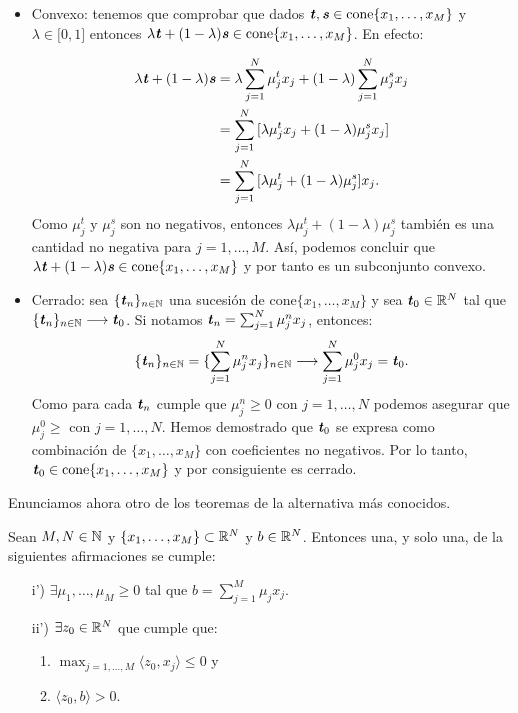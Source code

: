 \begin{itemize}
	\item  Convexo: tenemos que comprobar que dados $ \textbf{\emph{t}}, \textbf{\emph{s}} \in \mathrm{cone}\{x_1,\dots, x_M \} $ y $ \lambda \in \lbrack 0,1 \rbrack $ entonces $ \lambda\textbf{\emph{t}} + (1-\lambda)\textbf{\emph{s}} \in \mathrm{cone}\{x_1,\dots, x_M \} $. En efecto:

	\begin{equation*}
	\begin{split}
		\lambda\textbf{\emph{t}} + (1-\lambda)\textbf{\emph{s}} &=   \lambda \sum_{j=1}^{N}{\mu_j^t x_j } + (1-\lambda)\sum_{j=1}^{N}{\mu_j^s x_j } \\
		&= \sum_{j=1}^{N}{\lbrack \lambda \mu_j^t x_j  + (1-\lambda)\mu_j^s x_j \rbrack} \\
		&= \sum_{j=1}^{N}{\lbrack \lambda \mu_j^t  + (1-\lambda)\mu_j^s \rbrack x_j}.
		\end{split}
		\end{equation*}
Como $ \mu_j^t \text{ y } \mu_j^s $ son no negativos, entonces $ \lambda \mu_j^t  + (1-\lambda)\mu_j^s  $ también es una cantidad no negativa para $ j=1,\dots,M $. Así, podemos concluir que $ \lambda\textbf{\emph{t}} + (1-\lambda)\textbf{\emph{s}} \in \mathrm{cone}\{x_1,\dots, x_M \} $ y por tanto es un subconjunto convexo.

\item Cerrado: sea $ \lbrace \textbf{\emph{t}}_n \rbrace_{ n \in \mathbb{N}} $ una sucesión de $ \mathrm{cone}\{x_1,\dots, x_M \} $ y sea $ \textbf{\emph{t}}_0 \in \mathbb{R}^N $ tal que $ \lbrace \textbf{\emph{t}}_n \rbrace_{ n \in \mathbb{N}} \longrightarrow \textbf{\emph{t}}_0 $. Si notamos $ \textbf{\emph{t}}_n = \sum_{j=1}^{N}{\mu_j^n x_j }$, entonces:
\[
\lbrace \textbf{\emph{t}}_n \rbrace_{ n \in \mathbb{N}} = \lbrace \sum_{j=1}^{N}{\mu_j^n x_j } \rbrace_{ n \in \mathbb{N}} \longrightarrow \sum_{j=1}^{N}{\mu_j^0 x_j } = \textbf{\emph{t}}_0.
\]
Como para cada $ \textbf{\emph{t}}_n $ cumple que $ \mu_j^n \geq 0$ con $ j=1,\dots,N $ podemos asegurar que $ \mu_j^0 \geq $ con $ j=1,\dots,N $. Hemos demostrado que $ \textbf{\emph{t}}_0 $ se expresa como combinación de $ \{x_1,\dots, x_M \} $ con coeficientes no negativos. Por lo tanto, $ \textbf{\emph{t}}_0 \in \mathrm{cone}\{x_1,\dots, x_M \}  $ y por consiguiente es cerrado. 
\end{itemize} 

Enunciamos ahora otro de los teoremas de la alternativa más conocidos.

\begin{lemaBox}
Sean $ M,N \in \mathbb{N} $ y $ \{x_1,\dots, x_M \} \subset \mathbb{R}^N $ y $ b \in \mathbb{R}^N $. Entonces una, y solo una, de la siguientes afirmaciones se cumple:
\begin{itemize}
\item[i')] $ \exists \mu_1,\dots,\mu_M \geq 0 $ tal que $ b = \sum_{j=1}^{M} \mu_j x_j$.
\item[ii')]$ \exists z_0 \in \mathbb{R}^N $ que cumple que:
\begin{enumerate}
	\item $ \max_{ j=1,\dots,M} \langle z_0, x_j \rangle \leq 0$ y
	\item $ \langle z_0, b\rangle > 0$.
\end{enumerate} 
\end{itemize}
\end{lemaBox}

